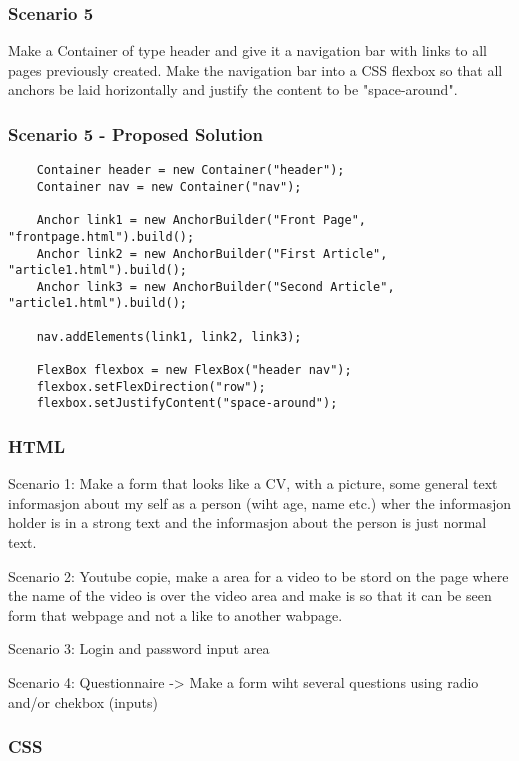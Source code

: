 \documentclass[12pt]{article}
\begin{document}
\subsubsection{Scenario 5}
Make a Container of type header and give it a navigation bar with links to all pages previously created. Make the navigation bar into a CSS flexbox so that all anchors be laid horizontally and justify the content to be "space-around".

\subsubsection{Scenario 5 - Proposed Solution}

\begin{lstlisting}
    Container header = new Container("header");
    Container nav = new Container("nav");

    Anchor link1 = new AnchorBuilder("Front Page", "frontpage.html").build();
    Anchor link2 = new AnchorBuilder("First Article", "article1.html").build();
    Anchor link3 = new AnchorBuilder("Second Article", "article1.html").build();

    nav.addElements(link1, link2, link3);

    FlexBox flexbox = new FlexBox("header nav");
    flexbox.setFlexDirection("row");
    flexbox.setJustifyContent("space-around");
\end{lstlisting}



    \subsubsection{HTML}

    Scenario 1: Make a form that looks like a CV, with a picture, some general text informasjon about my self as a person (wiht age, name etc.) wher the informasjon holder is in a strong text and the informasjon about the person is just normal text.

    Scenario 2: Youtube copie, make a area for a video to be stord on the page where the name of the video is over the video area and make is so that it can be seen form that webpage and not a like to another wabpage.

    Scenario 3: Login and password input area

    Scenario 4: Questionnaire -> Make a form wiht several questions using radio and/or chekbox (inputs)

    \subsubsection{CSS}
\end{document}
